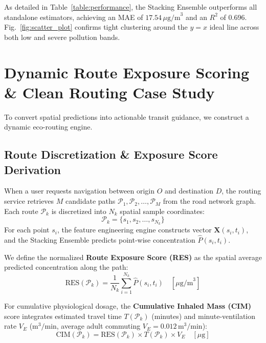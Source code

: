 \documentclass[journal]{IEEEtran}
\begin{document}
As detailed in Table~\ref{table:performance}, the Stacking Ensemble outperforms all standalone estimators, achieving an MAE of $17.54\,\mu\text{g/m}^3$ and an $R^2$ of 0.696. Fig.~\ref{fig:scatter_plot} confirms tight clustering around the $y=x$ ideal line across both low and severe pollution bands.

\section{Dynamic Route Exposure Scoring \& Clean Routing Case Study}
To convert spatial predictions into actionable transit guidance, we construct a dynamic eco-routing engine.

\subsection{Route Discretization \& Exposure Score Derivation}
When a user requests navigation between origin $O$ and destination $D$, the routing service retrieves $M$ candidate paths $\mathcal{P}_1, \mathcal{P}_2, \dots, \mathcal{P}_M$ from the road network graph. Each route $\mathcal{P}_k$ is discretized into $N_k$ spatial sample coordinates:
\begin{equation}
\mathcal{P}_k = \{s_1, s_2, \dots, s_{N_k}\}
\end{equation}
For each point $s_i$, the feature engineering engine constructs vector $\mathbf{X}(s_i, t_i)$, and the Stacking Ensemble predicts point-wise concentration $\hat{P}(s_i, t_i)$.

We define the normalized \textbf{Route Exposure Score (RES)} as the spatial average predicted concentration along the path:
\begin{equation}
\text{RES}(\mathcal{P}_k) = \frac{1}{N_k} \sum_{i=1}^{N_k} \hat{P}(s_i, t_i) \quad \left[\mu\text{g/m}^3\right]
\end{equation}

For cumulative physiological dosage, the \textbf{Cumulative Inhaled Mass (CIM)} score integrates estimated travel time $T(\mathcal{P}_k)$ (minutes) and minute-ventilation rate $V_E$ ($\text{m}^3/\text{min}$, average adult commuting $V_E = 0.012\,\text{m}^3/\text{min}$):
\begin{equation}
\text{CIM}(\mathcal{P}_k) = \text{RES}(\mathcal{P}_k) \times T(\mathcal{P}_k) \times V_E \quad [\mu\text{g}]
\end{equation}
\end{document}
